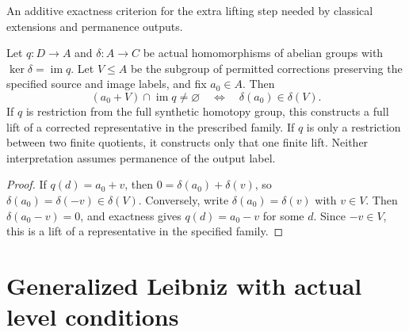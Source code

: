 \begin{proposition}
\label{sem:ProofTools:ml-representative-family-lift}
An additive exactness criterion for the extra lifting step needed by
classical extensions and permanence outputs.\par
Let $q:D\to A$ and $\delta:A\to C$ be actual homomorphisms of abelian
groups with $\ker\delta=\operatorname{im}q$. Let $V\leq A$ be the
subgroup of permitted corrections preserving the specified source and
image labels, and fix $a_0\in A$. Then
\[
 (a_0+V)\cap\operatorname{im}q\ne\varnothing
 \quad\Longleftrightarrow\quad \delta(a_0)\in\delta(V).
\]
If $q$ is restriction from the full synthetic homotopy group, this
constructs a full lift of a corrected representative in the prescribed
family. If $q$ is only a restriction between two finite quotients, it
constructs only that one finite lift. Neither interpretation assumes
permanence of the output label.
\end{proposition}
\begin{proof}
If $q(d)=a_0+v$, then $0=\delta(a_0)+\delta(v)$, so
$\delta(a_0)=\delta(-v)\in\delta(V)$. Conversely, write
$\delta(a_0)=\delta(v)$ with $v\in V$. Then
$\delta(a_0-v)=0$, and exactness gives $q(d)=a_0-v$ for some $d$.
Since $-v\in V$, this is a lift of a representative in the specified family.
\end{proof}

\section{Generalized Leibniz with actual level conditions}

